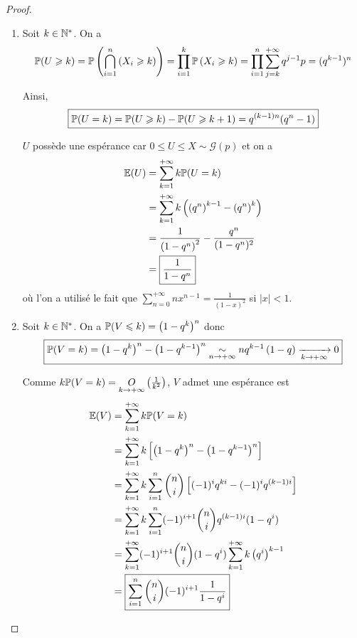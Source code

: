 \documentclass[12pt]{article}
\begin{document}
\begin{proof}
    \phantom{}
    \begin{enumerate}
        \item Soit $k\in\N^{*}$. On a 
        \begin{equation}
            \P(U\geqslant k)=\P\left(\bigcap_{i=1}^{n}\left(X_{i}\geqslant k\right)\right)=\prod_{i=1}^{k}\P\left(X_{i}\geqslant k\right)=\prod_{i=1}^{n}\sum_{j=k}^{+\infty}q^{j-1}p=(q^{k-1})^{n}
        \end{equation}

        Ainsi, 
        \begin{equation}
            \boxed{\P(U=k)=\P(U\geqslant k)-\P(U\geqslant k+1)=q^{(k-1)n}(q^{n}-1)}
        \end{equation}

        $U$ possède une espérance car $0\leqslant U\leqslant X\sim\mathcal{G}(p)$ et on a 
        \begin{align}
            \E(U)
            &=\sum_{k=1}^{+\infty}k\P(U=k)\\
            &=\sum_{k=1}^{+\infty}k\left(\left(q^{n}\right)^{k-1}-\left(q^{n}\right)^{k}\right)\\
            &=\frac{1}{\left(1-q^{n}\right)^{2}}-\frac{q^{n}}{(1-q^{n})^{2}}\\
            &=\boxed{\frac{1}{1-q^{n}}}
        \end{align}
        où l'on a utilisé le fait que $\sum_{n=0}^{+\infty}nx^{n-1}=\frac{1}{(1-x)^{2}}$ si $\left\lvert x\right\rvert<1$.

        \item Soit $k\in\N^{*}$. On a $\P(V\leqslant k)=\left(1-q^{k}\right)^{n}$ donc 
        \begin{equation}
            \boxed{\P(V=k)=\left(1-q^{k}\right)^{n}-\left(1-q^{k-1}\right)^{n}\underset{n\to+\infty}{\sim}nq^{k-1}\left(1-q\right)\xrightarrow[k\to+\infty]{}0}
        \end{equation}

        Comme $k\P(V=k)=\underset{k\to+\infty}{O}\left(\frac{1}{k^{2}}\right)$, $V$ admet une espérance est 
        \begin{align}
            \E(V)
            &=\sum_{k=1}^{+\infty}k\P(V=k)\\
            &=\sum_{k=1}^{+\infty}k\left[\left(1-q^{k}\right)^{n}-\left(1-q^{k-1}\right)^{n}\right]\\
            &=\sum_{k=1}^{+\infty}k\sum_{i=1}^{n}\binom{n}{i}\left[(-1)^{i}q^{ki}-(-1)^{i}q^{(k-1)i}\right]\\
            &=\sum_{k=1}^{+\infty}k\sum_{i=1}^{n}(-1)^{i+1}\binom{n}{i}q^{(k-1)i}(1-q^{i})\\
            &=\sum_{k=1}^{+\infty}(-1)^{i+1}\binom{n}{i}(1-q^{i})\sum_{k=1}^{+\infty}k\left(q^{i}\right)^{k-1}\\
            &=\boxed{\sum_{i=1}^{n}\binom{n}{i}(-1)^{i+1}\frac{1}{1-q^{i}}}
        \end{align}
    \end{enumerate}
\end{proof}
\end{document}
